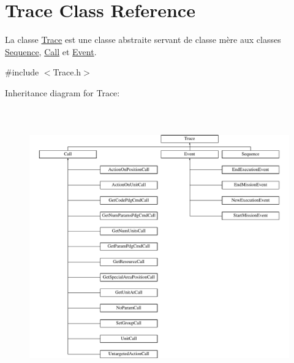 \hypertarget{class_trace}{}\section{Trace Class Reference}
\label{class_trace}


La classe \hyperlink{class_trace}{Trace} est une classe abstraite servant de classe mère aux classes \hyperlink{class_sequence}{Sequence}, \hyperlink{class_call}{Call} et \hyperlink{class_event}{Event}.  




{\ttfamily \#include $<$Trace.\+h$>$}

Inheritance diagram for Trace\+:\begin{figure}[H]
\begin{center}
\leavevmode
\includegraphics[height=12.000000cm]{class_trace}
\end{center}
\end{figure}
